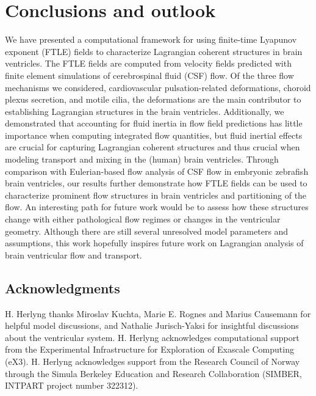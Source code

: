 \documentclass{template}
\begin{document}
\section{Conclusions and outlook}
We have presented a computational framework for using finite-time Lyapunov exponent (FTLE)
fields to characterize Lagrangian coherent structures in brain ventricles.
The FTLE fields are computed from velocity fields predicted with finite element simulations
of cerebrospinal fluid (CSF) flow. Of the three flow mechanisms we considered, cardiovascular pulsation-related
deformations, choroid plexus secretion, and motile cilia, the deformations are the main contributor to
establishing Lagrangian structures in the brain ventricles. Additionally,
we demonstrated that accounting for fluid inertia
in flow field predictions has little importance when computing integrated flow quantities,
but fluid inertial effects are crucial for capturing Lagrangian coherent structures and thus crucial when
modeling transport and mixing in the (human) brain ventricles. Through comparison with
Eulerian-based flow analysis of CSF flow in embryonic zebrafish brain ventricles, our results further
demonstrate how FTLE fields can be used to characterize prominent flow structures in brain ventricles
and partitioning of the flow.
An interesting path for future work would be to assess how these structures change
with either pathological flow regimes or changes in the ventricular geometry.
Although there are still several unresolved model parameters and assumptions,
this work hopefully inspires future work on Lagrangian analysis of brain ventricular flow and transport.

\subsection*{Acknowledgments}
H. Herlyng thanks Miroslav Kuchta, Marie E. Rognes
and Marius Causemann for helpful model discussions,
and Nathalie Jurisch-Yaksi for
insightful discussions about the ventricular system.
H. Herlyng acknowledges computational support from the
Experimental Infrastructure for Exploration of Exascale
Computing (eX3). H. Herlyng acknowledges support from
the Research Council of Norway through 
the Simula Berkeley Education and Research Collaboration
(SIMBER, INTPART project number 322312).

\end{document}
